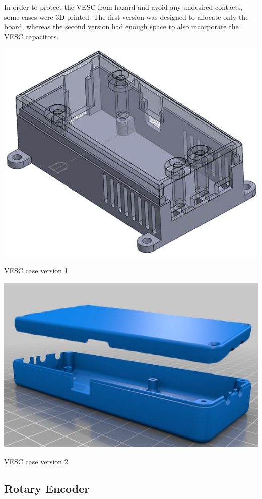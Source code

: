 In order to protect the VESC from hazard and avoid any undesired contacts, some cases were 3D printed. The first version was designed to allocate only the board, whereas the second version had enough space to also incorporate the VESC capacitors.
\begin{marginfigure}[-4cm]
	\includegraphics[width=0.9\linewidth]{figs/05/vesc_case_3}
	\caption{VESC case version 1}
\end{marginfigure}
\begin{marginfigure}
	\includegraphics[width=0.9\linewidth]{figs/05/vesc_case_6}
	\caption{VESC case version 2}
\end{marginfigure}

\newpage
\subsection{Rotary Encoder}

